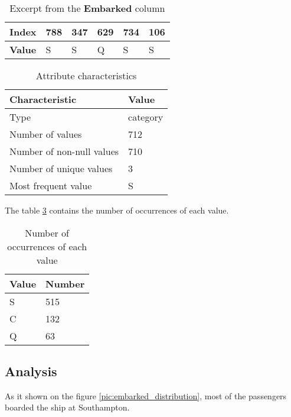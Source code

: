 \begin{table}[!hp]
    \centering
    \caption{Excerpt from the \textbf{Embarked} column}
    \begin{tabular}{|l|l|l|l|l|l|}
        \hline
        \textbf{Index} & 788 & 347 & 629 & 734 & 106 \\ \hline
        \textbf{Value} & S   & S   & Q   & S   & S   \\ \hline
    \end{tabular}
    \label{table:embarked_head}
\end{table}

\begin{table}[!hp]
    \centering
    \caption{Attribute characteristics}
    \begin{tabular}{|l|l|}
        \hline
        \textbf{Characteristic}   & \textbf{Value} \\ \hline
        Type                      & category       \\ \hline
        Number of values          & 712            \\ \hline
        Number of non-null values & 710            \\ \hline
        Number of unique values   & 3              \\ \hline
        Most frequent value       & S              \\ \hline
    \end{tabular}
    \label{table:embarked_characteristics}
\end{table}

The table \ref{table:embarked_value_counts} contains the number of occurrences 
of each value.

\begin{table}[!hp]
    \centering
    \caption{Number of occurrences of each value}
    \begin{tabular}{|l|l|}
        \hline
        \textbf{Value} & \textbf{Number} \\ \hline
        S              & 515             \\ \hline
        C              & 132             \\ \hline
        Q              &  63             \\ \hline
    \end{tabular}
    \label{table:embarked_value_counts}
\end{table}

\subsection{Analysis}
As it shown on the figure \ref{pic:embarked_distribution}, most of the 
passengers boarded the ship at Southampton.

